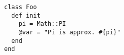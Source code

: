 \documentclass{article}
\begin{document}
\begin{verbatim}
class Foo
  def init
    pi = Math::PI
    @var = "Pi is approx. #{pi}"
  end
end
\end{verbatim}
\end{document}

